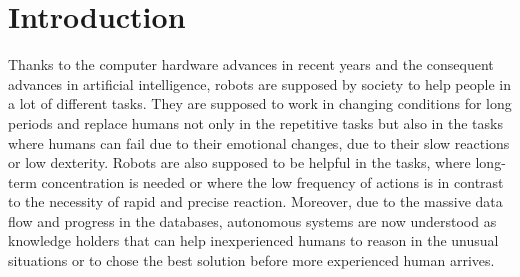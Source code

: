 
%
\section{Introduction}

Thanks to the computer hardware advances in recent years and the consequent advances in artificial intelligence, robots are supposed by society to help people in a lot of different tasks.
They are supposed to work in changing conditions for long periods and replace humans not only in the repetitive tasks but also in the tasks where humans can fail due to their emotional changes, due to their slow reactions or low dexterity.
Robots are also supposed to be helpful in the tasks, where long-term concentration is needed or where the low frequency of actions is in contrast to the necessity of rapid and precise reaction.
Moreover, due to the massive data flow and progress in the databases, autonomous systems are now understood as knowledge holders that can help inexperienced humans to reason in the unusual situations or to chose the best solution before more experienced human arrives.

